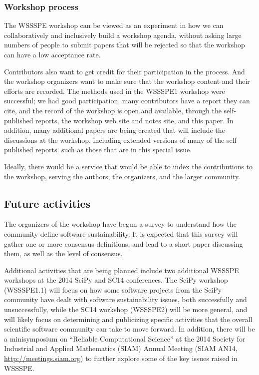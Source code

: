 \documentclass[11pt, oneside]{amsart}
\begin{document}
\subsubsection*{Workshop process}
The WSSSPE workshop can be viewed as an experiment in how we can
collaboratively and inclusively build a workshop agenda, without asking
large numbers of people to submit papers that will be rejected so that the
workshop can have a low acceptance rate.

Contributors also want to get credit for their participation in the process.
And the workshop organizers want to make sure that the workshop content and
their efforts are recorded.  The methods used in the WSSSPE1 workshop
were successful; we had good participation, many contributors have a
report they can cite, and the record of the workshop is open and available,
through the self-published reports, the workshop web site and notes site,
and this paper.  In addition, many additional papers are being created that
will include the discussions at the workshop, including extended versions
of many of the self published reports. such as those that are in this
special issue.

Ideally, there would be a service that
would be able to index the contributions to the workshop, serving the
authors, the organizers, and the larger community.

\subsection{Future activities}

The organizers of the workshop have begun a survey to understand how
the community define software sustainability.  It is expected that this survey
will gather one or more consensus definitions, and lead to a short paper
discussing them, as well as the level of consensus.

Additional activities that are being planned include
two additional WSSSPE workshops at the 2014 SciPy and SC14 conferences.
The SciPy workshop (WSSSPE1.1) will focus on how some software projects
from the SciPy community have dealt with software sustainability issues, both
successfully and unsuccessfully, while the SC14 workshop (WSSSPE2) will
be more general, and will likely focus on determining and publicizing specific
activities that the overall scientific software community can take to move forward.
In addition, there will be a minisymposium on ``Reliable Computational Science''
at the 2014 Society for Industrial and Applied Mathematics (SIAM)
Annual Meeting (SIAM AN14, \url{http://meetings.siam.org})
to further explore some of the key issues raised in
WSSSPE.
\end{document}
